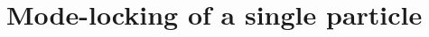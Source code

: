 \documentclass[twocolumn,preprintnumbers,amsmath,amssymb,aps,prx]{revtex4}
\begin{document}
%
\section{Mode-locking of a single particle}
\label{sec:one}
\end{document}
